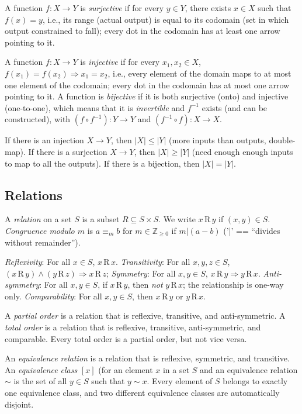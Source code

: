 \documentclass[10pt,letterpaper,twocolumn]{article}
\newcommand{\bb}[1]{\mathbb{#1}}
\newcommand{\Z}{\bb{Z}}
\newcommand{\rr}{\,\textrm{R}\,}
\begin{document}
A function $ f: X \to Y $ is \emph{surjective} 
if for every $ y \in Y $, there exists $ x \in X $
such that $ f(x) = y $, i.e., its range (actual
output) is equal to its codomain (set in which 
output constrained to fall); every dot in the
codomain has at least one arrow pointing to it. 

A function $ f: X \to Y $ is \emph{injective} 
if for every $ x_1, x_2 \in X $, 
$ f(x_1) = f(x_2) \Rightarrow x_1 = x_2 $, i.e.,
every element of the domain maps to at most one
element of the codomain; every dot in the codomain
has at most one arrow pointing to it. A function is
\emph{bijective} if it is both surjective (onto)
and injective (one-to-one), which means that 
it is \emph{invertible} and $ f^{-1} $ exists
(and can be constructed), with 
$ (f \circ f^{-1}): Y \to Y $ and 
$ (f^{-1} \circ f): X \to X $. 

If there is an injection $ X \to Y $, 
then $ |X| \le |Y| $ (more inputs than outputs, 
double-map). If there is a surjection $ X \to Y $, 
then $ |X| \ge |Y| $ (need enough enough inputs
to map to all the outputs). If there is a bijection,
then $ |X| = |Y| $. 


\subsection{Relations} 

A \emph{relation} on a set $ S $ is a subset 
$ R \subseteq S \times S $. We write $ x \rr y $ 
if $ (x, y) \in S $. \emph{Congruence modulo $ m $}
is $ a \equiv_m b $ for $ m \in \Z_{\ge 0} $ 
if $ m | (a - b) $ 
('|' ==  ``divides without remainder'').

\emph{Reflexivity}: For all $ x \in S $, $ x \rr x $.
\emph{Transitivity}: For all $ x, y, z \in S $, 
$ (x \rr y) \land (y \rr z) \Rightarrow x \rr z $;
\emph{Symmetry}: For all $ x, y \in S $, 
$ x \rr y \Rightarrow y \rr x $.
\emph{Anti-symmetry}: For all $ x, y \in S $, 
if $ x \rr y $, then \textit{not} $ y \rr x $;
the relationship is one-way only. 
\emph{Comparability}: For all $ x, y \in S $, 
then $ x \rr y $ or $ y \rr x $.

A \emph{partial order} is a relation that is 
reflexive, transitive, and anti-symmetric. 
A \emph{total order} is a relation that is
reflexive, transitive, anti-symmetric, 
and comparable. Every total order is 
a partial order, but not vice versa.

An \emph{equivalence relation} is a relation that
is reflexive, symmetric, and transitive. 
An \emph{equivalence class} $ [x] $ (for an element 
$ x $ in a set $ S $ and an equivalence relation
$ \sim $ is the set of all $ y \in S $ such that 
$ y \sim x $. Every element of $ S $ belongs to 
exactly one equivalence class, and two different 
equivalence classes are automatically disjoint. 
\end{document}
